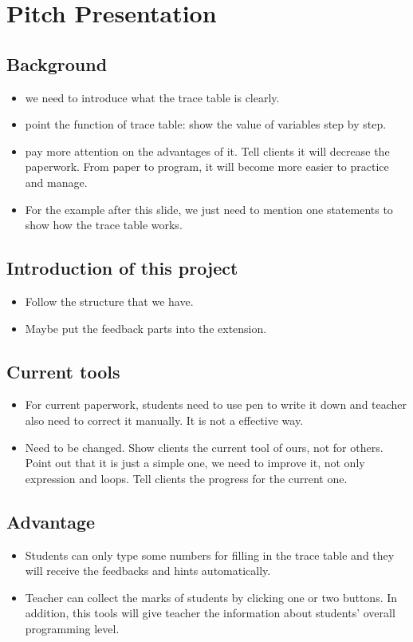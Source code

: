 \documentclass[11pt, a4paper]{article}
\begin{document}
\section{Pitch Presentation}
\subsection{Background}
\begin{itemize}
\item we need to introduce what the trace table is clearly.
\item point the function of trace table: show the value of variables step by step. 
\item pay more attention on the advantages of it. Tell clients it will decrease the paperwork. From paper to program, it will become more easier to practice and manage.
\item For the example after this slide, we just need to mention one statements to show how the trace table works.

\end{itemize}

\subsection{Introduction of this project}
\begin{itemize}
\item Follow the structure that we have.
\item Maybe put the feedback parts into the extension.

\end{itemize}

\subsection{Current tools}
\begin{itemize}
\item For current paperwork, students need to use pen to write it down and teacher also need to correct it manually. It is not a effective way.
\item Need to be changed. Show clients the current tool of ours, not for others. Point out that it is just a simple one, we need to improve it, not only expression and loops. Tell clients the progress for the current one.

\end{itemize}

\subsection{Advantage}
\begin{itemize}
\item Students can only type some numbers for filling in the trace table and they will receive the feedbacks and hints automatically.
\item Teacher can collect the marks of students by clicking one or two buttons. In addition, this tools will give teacher the information about students' overall programming level.
\end{itemize}
\end{document}
